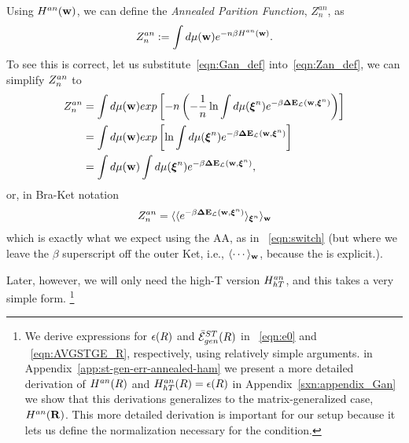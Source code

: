 Using $H^{an}({\mathbf{w}})$, we can define the \emph{Annealed Parition Function}, $Z^{an}_{n}$, as
\begin{align}
  \label{eqn:Zan_def}
  Z^{an}_{n} :=  \int d\mu({\mathbf{w}}) e^{-n\beta H^{an}({\mathbf{w}})}.
\end{align}
To see this is correct, let us substitute~\ref{eqn:Gan_def} into~\ref{eqn:Zan_def}, we can simplify $Z^{an}_{n}$ to
\begin{align}
  \label{eqn:Zan_simple}
  Z^{an}_{n} &=  \int d\mu({\mathbf{w}}) exp\left[-n \left(- \frac{1}{n}\ln  \int d\mu(\boldsymbol{\xi}^{n})e^{-\beta\mathbf{\Delta {E}}_{\mathcal{L}}(\mathbf{w}, \boldsymbol{\xi}^{n})}\right)\right] \\ \nonumber
  &=  \int d\mu({\mathbf{w}}) exp\left[\ln  \int d\mu(\boldsymbol{\xi}^{n})e^{-\beta\mathbf{\Delta {E}}_{\mathcal{L}}(\mathbf{w}, \boldsymbol{\xi}^{n})}\right] \\ \nonumber
  &=  \int d\mu({\mathbf{w}})  \int d\mu(\boldsymbol{\xi}^{n})e^{-\beta\mathbf{\Delta {E}}_{\mathcal{L}}(\mathbf{w}, \boldsymbol{\xi}^{n})} ,
\end{align}
or, in Bra-Ket notation
\begin{align}
  \label{eqn:Zan_brakets}
  Z^{an}_{n} = \langle\langle e^{-\beta\mathbf{\Delta {E}}_{\mathcal{L}}(\mathbf{w}, \boldsymbol{\xi}^{n})}\rangle_{\boldsymbol{\xi}^{n}}\rangle_{{\mathbf{w}}}
\end{align}
which is exactly what we expect using the AA, as in \EQN~\ref{eqn:switch}
(but where we leave the $\beta$ superscript off the outer Ket,
i.e., $\langle\cdots\rangle_{{\mathbf{w}}}$,  because the \ThermalAverage is explicit.).

Later, however, we will only need the high-T version $H^{an}_{hT}$, and this takes a very simple form.
\footnote{We derive expressions for $\epsilon(R)$ and $\bar{\mathcal{E}}^{ST}_{gen}(R)$ in \EQN~\ref{eqn:e0} and \EQN~\ref{eqn:AVGSTGE_R}, respectively, using relatively simple arguments.
in Appendix~\ref{app:st-gen-err-annealed-ham} we present
a more detailed derivation of $H^{an}(R)$ and $H^{an}_{hT}(R)=\epsilon(R)$
in Appendix~\ref{sxn:appendix_Gan} we show that this derivations generalizes to the matrix-generalized case, $H^{an}(\mathbf{R})$.
This more detailed derivation is important for our \SETOL setup because it lets us define the normalization
necessary for the \TRACELOG condition.
}



